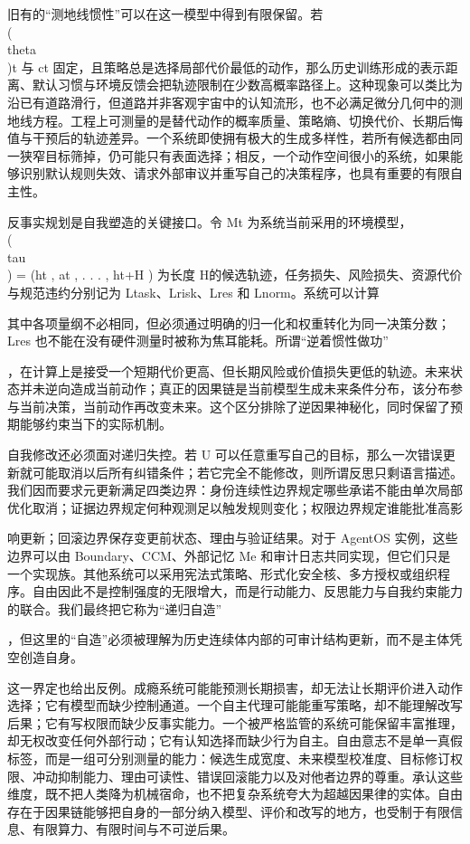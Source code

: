 旧有的“测地线惯性”可以在这一模型中得到有限保留。若 \\(\\theta\\)t 与 ct 固定，且策略总是选择局部代价最低的动作，那么历史训练形成的表示距离、默认习惯与环境反馈会把轨迹限制在少数高概率路径上。这种现象可以类比为沿已有道路滑行，但道路并非客观宇宙中的认知流形，也不必满足微分几何中的测地线方程。工程上可测量的是替代动作的概率质量、策略熵、切换代价、长期后悔值与干预后的轨迹差异。一个系统即使拥有极大的生成多样性，若所有候选都由同一狭窄目标筛掉，仍可能只有表面选择；相反，一个动作空间很小的系统，如果能够识别默认规则失效、请求外部审议并重写自己的决策程序，也具有重要的有限自主性。

反事实规划是自我塑造的关键接口。令 Mt 为系统当前采用的环境模型，\\(\\tau\\) = (ht , at , . . . , ht+H ) 为长度 H的候选轨迹，任务损失、风险损失、资源代价与规范违约分别记为 Ltask、Lrisk、Lres 和 Lnorm。系统可以计算

其中各项量纲不必相同，但必须通过明确的归一化和权重转化为同一决策分数；Lres 也不能在没有硬件测量时被称为焦耳能耗。所谓“逆着惯性做功”

，在计算上是接受一个短期代价更高、但长期风险或价值损失更低的轨迹。未来状态并未逆向造成当前动作；真正的因果链是当前模型生成未来条件分布，该分布参与当前决策，当前动作再改变未来。这个区分排除了逆因果神秘化，同时保留了预期能够约束当下的实际机制。

自我修改还必须面对递归失控。若 U 可以任意重写自己的目标，那么一次错误更新就可能取消以后所有纠错条件；若它完全不能修改，则所谓反思只剩语言描述。我们因而要求元更新满足四类边界：身份连续性边界规定哪些承诺不能由单次局部优化取消；证据边界规定何种观测足以触发规则变化；权限边界规定谁能批准高影

响更新；回滚边界保存变更前状态、理由与验证结果。对于 AgentOS 实例，这些边界可以由 Boundary、CCM、外部记忆 Me 和审计日志共同实现，但它们只是一个实现族。其他系统可以采用宪法式策略、形式化安全核、多方授权或组织程序。自由因此不是控制强度的无限增大，而是行动能力、反思能力与自我约束能力的联合。我们最终把它称为“递归自造”

，但这里的“自造”必须被理解为历史连续体内部的可审计结构更新，而不是主体凭空创造自身。

这一界定也给出反例。成瘾系统可能能预测长期损害，却无法让长期评价进入动作选择；它有模型而缺少控制通道。一个自主代理可能能重写策略，却不能理解改写后果；它有写权限而缺少反事实能力。一个被严格监管的系统可能保留丰富推理，却无权改变任何外部行动；它有认知选择而缺少行为自主。自由意志不是单一真假标签，而是一组可分别测量的能力：候选生成宽度、未来模型校准度、目标修订权限、冲动抑制能力、理由可读性、错误回滚能力以及对他者边界的尊重。承认这些维度，既不把人类降为机械宿命，也不把复杂系统夸大为超越因果律的实体。自由存在于因果链能够把自身的一部分纳入模型、评价和改写的地方，也受制于有限信息、有限算力、有限时间与不可逆后果。

